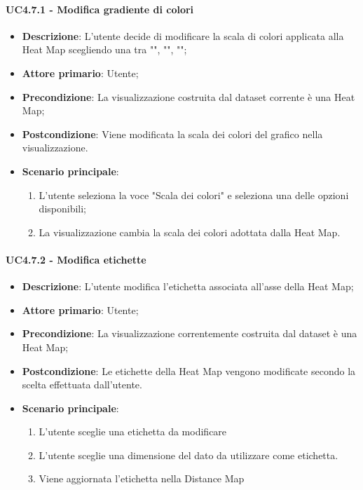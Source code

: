 \paragraph{UC4.7.1 - Modifica gradiente di colori}
\label{par:uc4.7.1}
\begin{itemize}
    \item \textbf{Descrizione}: L'utente decide di modificare la scala di colori applicata alla Heat Map scegliendo una tra "", "", "";

    \item \textbf{Attore primario}: Utente;

    \item \textbf{Precondizione}:   La visualizzazione costruita dal dataset corrente è una Heat Map;
    \item \textbf{Postcondizione}:  Viene modificata la scala dei colori del grafico nella visualizzazione.

	\item \textbf{Scenario principale}:
        \begin{enumerate}
            \item L'utente seleziona la voce "Scala dei colori" e seleziona una delle opzioni disponibili;
            \item La visualizzazione cambia la scala dei colori adottata dalla Heat Map.
        \end{enumerate}
\end{itemize}

\paragraph{UC4.7.2 - Modifica etichette}
\label{par:uc4.7.2}
\begin{itemize}
    \item \textbf{Descrizione}:     L'utente modifica l'etichetta associata all'asse della Heat Map;
    \item \textbf{Attore primario}: Utente;
    \item \textbf{Precondizione}:   La visualizzazione correntemente costruita dal dataset è una Heat Map;
    \item \textbf{Postcondizione}:  Le etichette della Heat Map vengono modificate secondo la scelta effettuata dall'utente.
    \item \textbf{Scenario principale}:
    \begin{enumerate}
        \item L'utente sceglie una etichetta da modificare
        \item L'utente sceglie una dimensione del dato da utilizzare come etichetta.
        \item Viene aggiornata l'etichetta nella Distance Map
    \end{enumerate}
\end{itemize}

